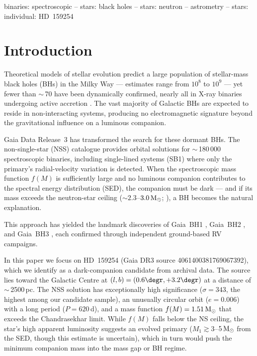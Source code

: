 \documentclass[usenatbib,fleqn]{mnras}
\newcommand{\Msun}{{\rm M}_\odot}
\newcommand{\fmass}{f(M)}
\begin{document}
\begin{keywords}
binaries: spectroscopic -- stars: black holes -- stars: neutron --
astrometry -- stars: individual: HD~159254
\end{keywords}

\section{Introduction}
\label{sec:intro}

Theoretical models of stellar evolution predict a large population
of stellar-mass black holes (BHs) in the Milky Way --- estimates
range from $10^8$ to $10^9$
\citep{AgolKamionkowski2002, Shapiro1983} --- yet fewer than
$\sim$\,70 have been dynamically confirmed, nearly all in X-ray
binaries undergoing active accretion
\citep{RemillardMcClintock2006}.  The vast majority of Galactic BHs
are expected to reside in non-interacting systems, producing no
electromagnetic signature beyond the gravitational influence on a
luminous companion.

Gaia Data Release~3 \citep[DR3;][]{GaiaCollaboration2023} has
transformed the search for these dormant BHs.  The non-single-star
(NSS) catalogue \citep{GaiaNSS2023} provides orbital solutions for
$\sim$\,180\,000 spectroscopic binaries, including single-lined
systems (SB1) where only the primary's radial-velocity variation is
detected.  When the spectroscopic mass function $\fmass$ is
sufficiently large and no luminous companion contributes to the
spectral energy distribution (SED), the companion must be dark ---
and if its mass exceeds the neutron-star ceiling
($\sim 2.3$--$3.0\,\Msun$; \citealt{Rezzolla2018}), a BH becomes
the natural explanation.

This approach has yielded the landmark discoveries of
Gaia~BH1 \citep{ElBadry2023a}, Gaia~BH2 \citep{ElBadry2023b}, and
Gaia~BH3 \citep{GaiaBH3_2024}, each confirmed through independent
ground-based RV campaigns.

In this paper we focus on HD~159254 (Gaia DR3 source
4061400381769067392), which we identify as a dark-companion
candidate from archival data.  The source lies toward the Galactic
Centre at $(l, b) = (0.6\degr, +3.2\degr)$ at a distance of
$\sim$\,2500\,pc.  The NSS solution has exceptionally high
significance ($\sigma = 343$, the highest among our candidate
sample), an unusually circular orbit ($e = 0.006$) with a long
period ($P = 620$\,d), and a mass function
$\fmass = 1.51\,\Msun$ that exceeds the Chandrasekhar limit.  While
$\fmass$ falls below the NS ceiling, the star's high apparent
luminosity suggests an evolved primary ($M_1 \gtrsim 3$--$5\,\Msun$
from the SED, though this estimate is uncertain),
which in turn would push the minimum companion mass into the mass gap or
BH regime.
\end{document}
